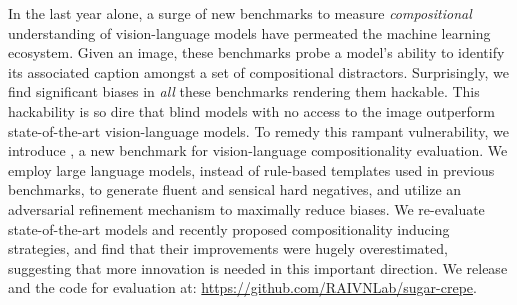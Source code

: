 In the last year alone, a surge of new benchmarks to measure \textit{compositional} understanding of vision-language models have permeated the machine learning ecosystem.
Given an image, these benchmarks probe a model's ability to identify its associated caption amongst a set of compositional distractors.
Surprisingly, we find significant biases in \textit{all} these benchmarks rendering them hackable. This hackability is so dire that blind models with no access to the image outperform state-of-the-art vision-language models.
To remedy this rampant vulnerability, we introduce \method, a new benchmark for vision-language compositionality evaluation.
We employ large language models, instead of rule-based templates used in previous benchmarks, to generate fluent and sensical hard negatives, and utilize an adversarial refinement mechanism to maximally reduce biases. We re-evaluate state-of-the-art models and recently proposed compositionality inducing strategies, and find that their improvements were hugely overestimated, suggesting that more innovation is needed in this important direction. We release \method and the code for evaluation at: \url{https://github.com/RAIVNLab/sugar-crepe}.